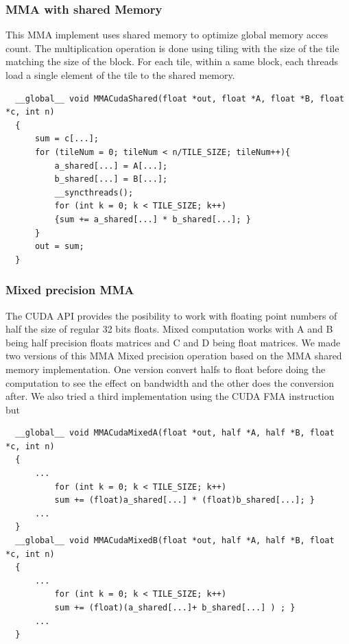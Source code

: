 \documentclass[conference]{IEEEtran}
\begin{document}
  \subsubsection[short]{MMA with shared Memory}
  This MMA implement uses shared memory to optimize global memory acces count. The multiplication operation 
  is done using tiling with the size of the tile matching the size of the block. For each tile, within
  a same block, each threads load a single element of the tile to the shared memory. 
  \begin{lstlisting}
  __global__ void MMACudaShared(float *out, float *A, float *B, float *c, int n)
  {   
      sum = c[...];
      for (tileNum = 0; tileNum < n/TILE_SIZE; tileNum++){
          a_shared[...] = A[...];
          b_shared[...] = B[...];
          __syncthreads();
          for (int k = 0; k < TILE_SIZE; k++)
          {sum += a_shared[...] * b_shared[...]; }
      }
      out = sum;
  }   
  \end{lstlisting}

  \subsubsection[short]{Mixed precision MMA}
  The CUDA API provides the posibility to work with floating point numbers of half the size of regular 32 bits floats.
  Mixed computation works with A and B being half precision floats matrices and C and D being float matrices.
  We made two versions of this MMA Mixed precision operation based on the MMA shared memory implementation. One version
  convert halfs to float before doing the computation to see the effect on bandwidth and the other does the conversion after.
  We also tried a third implementation using the CUDA FMA instruction but  
  \begin{lstlisting}
  __global__ void MMACudaMixedA(float *out, half *A, half *B, float *c, int n)
  {   
      ...
          for (int k = 0; k < TILE_SIZE; k++)
          sum += (float)a_shared[...] * (float)b_shared[...]; }
      ...
  }
  __global__ void MMACudaMixedB(float *out, half *A, half *B, float *c, int n)
  {   
      ...
          for (int k = 0; k < TILE_SIZE; k++)
          sum += (float)(a_shared[...]+ b_shared[...] ) ; }
      ...
  }
  \end{lstlisting}
\end{document}
